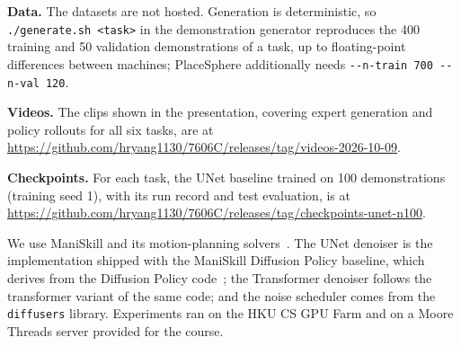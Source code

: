 \textbf{Data.} The datasets are not hosted. Generation is deterministic, so
\texttt{./generate.sh <task>} in the demonstration generator reproduces the
400 training and 50 validation demonstrations of a task, up to floating-point
differences between machines; PlaceSphere additionally needs
\texttt{-{}-n-train 700 -{}-n-val 120}.

\textbf{Videos.} The clips shown in the presentation, covering expert
generation and policy rollouts for all six tasks, are at
\url{https://github.com/hryang1130/7606C/releases/tag/videos-2026-10-09}.

\textbf{Checkpoints.} For each task, the UNet baseline trained on 100
demonstrations (training seed 1), with its run record and test evaluation, is
at \url{https://github.com/hryang1130/7606C/releases/tag/checkpoints-unet-n100}.

We use ManiSkill and its motion-planning solvers~\citep{tao2024maniskill3}.
The UNet denoiser is the implementation shipped with the ManiSkill Diffusion
Policy baseline, which derives from the Diffusion Policy
code~\citep{chi2023diffusion}; the Transformer denoiser follows the
transformer variant of the same code; and the noise scheduler comes from the
\texttt{diffusers} library. Experiments ran on the HKU CS GPU Farm and on a
Moore Threads server provided for the course.
